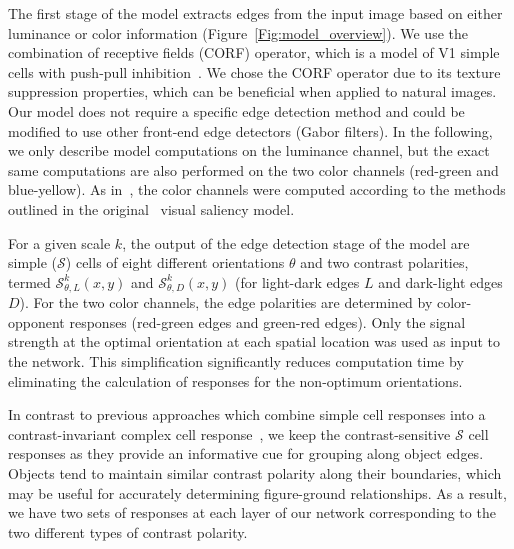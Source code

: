 The first stage of the model extracts edges from the input image based on either luminance or color information (Figure~\ref{Fig:model_overview}). We use the combination of receptive fields (CORF) operator, which is a model of V1 simple cells with push-pull inhibition~\citep{Azzopardi_etal14}. We chose the CORF operator due to its texture suppression properties, which can be beneficial when applied to natural images. Our model does not require a specific edge detection method and could be modified to use other front-end edge detectors (\eg Gabor filters). In the following, we only describe model computations on the luminance channel, but the exact same computations are also performed on the two color channels (\ie red-green and blue-yellow). As in~\citet{Russell_etal14}, the color channels were computed according to the methods outlined in the original~\citet{Itti_etal98a} visual saliency model.

For a given scale $k$, the output of the edge detection stage of the model are simple ($\mathcal{S}$) cells of eight different orientations $\theta$ and two contrast polarities, termed $\mathcal{S}^k_{\theta,L}(x,y)$ and $\mathcal{S}^k_{\theta,D}(x,y)$ (\ie for light-dark edges $L$ and dark-light edges $D$). For the two color channels, the edge polarities are determined by color-opponent responses (\eg red-green edges and green-red edges). Only the signal strength at the optimal orientation at each spatial location was used as input to the network. This simplification significantly reduces computation time by eliminating the calculation of responses for the non-optimum orientations.

In contrast to previous approaches which combine simple cell responses into a contrast-invariant complex cell response~\citep{Russell_etal14}, we keep the contrast-sensitive
$\mathcal{S}$ cell responses as they provide an informative cue for grouping along object edges. Objects tend to maintain similar contrast polarity along their boundaries, which may be useful for accurately determining figure-ground relationships. As a result, we have two sets of responses at each layer of our network corresponding to the two different types of contrast polarity.

